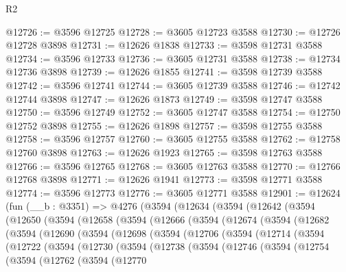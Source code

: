 \begin{lexlean}{R2}
\begin{coremodule}
@12726 := @3596 @12725
@12728 := @3605 @12723 @3588
@12730 := @12726 @12728 @3898
@12731 := @12626 @1838
@12733 := @3598 @12731 @3588
@12734 := @3596 @12733
@12736 := @3605 @12731 @3588
@12738 := @12734 @12736 @3898
@12739 := @12626 @1855
@12741 := @3598 @12739 @3588
@12742 := @3596 @12741
@12744 := @3605 @12739 @3588
@12746 := @12742 @12744 @3898
@12747 := @12626 @1873
@12749 := @3598 @12747 @3588
@12750 := @3596 @12749
@12752 := @3605 @12747 @3588
@12754 := @12750 @12752 @3898
@12755 := @12626 @1898
@12757 := @3598 @12755 @3588
@12758 := @3596 @12757
@12760 := @3605 @12755 @3588
@12762 := @12758 @12760 @3898
@12763 := @12626 @1923
@12765 := @3598 @12763 @3588
@12766 := @3596 @12765
@12768 := @3605 @12763 @3588
@12770 := @12766 @12768 @3898
@12771 := @12626 @1941
@12773 := @3598 @12771 @3588
@12774 := @3596 @12773
@12776 := @3605 @12771 @3588
@12901 := @12624
    (fun (__b : @3351) =>
    @4276
      (@3594
        (@12634
          (@3594
            (@12642
              (@3594
                (@12650
                  (@3594
                    (@12658
                      (@3594
                        (@12666
                          (@3594
                            (@12674
                              (@3594
                                (@12682
                                  (@3594
                                    (@12690
                                      (@3594
                                        (@12698
                                          (@3594
                                            (@12706
                                              (@3594
                                                (@12714
                                                  (@3594
                                                    (@12722
                                                      (@3594
                                                        (@12730
                                                          (@3594
                                                            (@12738
                                                              (@3594
                                                                (@12746
                                                                  (@3594
                                                                    (@12754
                                                                      (@3594
                                                                        (@12762
                                                                          (@3594
                                                                            (@12770

\end{coremodule}
\end{lexlean}
